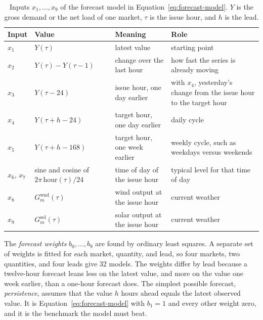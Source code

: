 \documentclass{UNCC-thesis}
\begin{document}
\begin{table}[htbp]
  \centering
  \footnotesize
  \caption{Inputs \(x_1,\dots,x_9\) of the forecast model in
  Equation~\eqref{eq:forecast-model}. \(Y\) is the gross demand or the net
  load of one market, \(\tau\) is the issue hour, and \(h\) is the lead.}
  \label{tab:forecast-inputs}
  \begin{tabular}{@{}L{0.07\columnwidth}L{0.23\columnwidth}L{0.27\columnwidth}L{0.33\columnwidth}@{}}
    \toprule
    Input & Value & Meaning & Role \\
    \midrule
    \(x_1\) & \(Y(\tau)\)
      & latest value
      & starting point \\
    \addlinespace
    \(x_2\) & \(Y(\tau)-Y(\tau-1)\)
      & change over the last hour
      & how fast the series is already moving \\
    \addlinespace
    \(x_3\) & \(Y(\tau-24)\)
      & issue hour, one day earlier
      & with \(x_4\), yesterday's change from the issue hour to the
        target hour \\
    \addlinespace
    \(x_4\) & \(Y(\tau+h-24)\)
      & target hour, one day earlier
      & daily cycle \\
    \addlinespace
    \(x_5\) & \(Y(\tau+h-168)\)
      & target hour, one week earlier
      & weekly cycle, such as weekdays versus weekends \\
    \addlinespace
    \(x_6\), \(x_7\) & sine and cosine of \(2\pi\,\mathrm{hour}(\tau)/24\)
      & time of day of the issue hour
      & typical level for that time of day \\
    \addlinespace
    \(x_8\) & \(G^{\mathrm{wnd}}_m(\tau)\)
      & wind output at the issue hour
      & current weather \\
    \addlinespace
    \(x_9\) & \(G^{\mathrm{sol}}_m(\tau)\)
      & solar output at the issue hour
      & current weather \\
    \bottomrule
  \end{tabular}
\end{table}

The \emph{forecast weights} \(b_0,\dots,b_9\) are found by ordinary least
squares. A separate set of weights is fitted for
each market, quantity, and lead, so four markets, two quantities, and four
leads give 32 models. The weights differ by lead because a twelve-hour
forecast leans less on the latest value, and more on the value one week
earlier, than a one-hour forecast does. The simplest possible forecast,
\emph{persistence}, assumes that the value \(h\) hours ahead equals the latest
observed value. It is Equation~\eqref{eq:forecast-model} with \(b_1=1\) and
every other weight zero, and it is the benchmark the model must beat.
\end{document}
